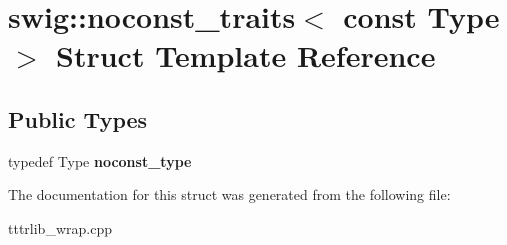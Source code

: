 \hypertarget{structswig_1_1noconst__traits_3_01const_01_type_01_4}{}\section{swig\+:\+:noconst\+\_\+traits$<$ const Type $>$ Struct Template Reference}
\label{structswig_1_1noconst__traits_3_01const_01_type_01_4}
\subsection*{Public Types}
\begin{DoxyCompactItemize}
\item 
\mbox{\label{structswig_1_1noconst__traits_3_01const_01_type_01_4_a47a8b24d65b72185304a9e51211f721f}} 
typedef Type {\bfseries noconst\+\_\+type}
\end{DoxyCompactItemize}


The documentation for this struct was generated from the following file\+:\begin{DoxyCompactItemize}
\item 
tttrlib\+\_\+wrap.\+cpp\end{DoxyCompactItemize}
